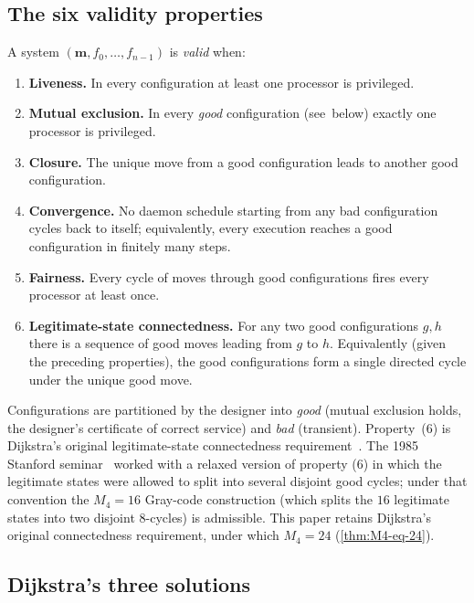 \documentclass[11pt,a4paper]{article}
\theoremstyle{plain}
\theoremstyle{definition}
\begin{document}
\subsection{The six validity properties}\label{sec:prelim-five}

A system $(\mathbf{m}, f_0, \ldots, f_{n-1})$ is \emph{valid} when:
\begin{enumerate}[leftmargin=*,label=(\arabic*)]
\item \textbf{Liveness.} In every configuration at least one processor is privileged.
\item \textbf{Mutual exclusion.} In every \emph{good} configuration
(see~below) exactly one processor is privileged.
\item \textbf{Closure.} The unique move from a good configuration leads
to another good configuration.
\item \textbf{Convergence.} No daemon schedule starting from any bad
configuration cycles back to itself; equivalently, every execution
reaches a good configuration in finitely many steps.
\item \textbf{Fairness.} Every cycle of moves through good configurations
fires every processor at least once.
\item \textbf{Legitimate-state connectedness.} For any two good
configurations $g, h$ there is a sequence of good moves leading from
$g$ to $h$.  Equivalently (given the preceding properties), the good
configurations form a single directed cycle under the unique good
move.
\end{enumerate}
Configurations are partitioned by the designer into \emph{good} (mutual
exclusion holds, the designer's certificate of correct service) and
\emph{bad} (transient).  Property~(6) is Dijkstra's original
legitimate-state connectedness
requirement~\cite[\S3]{Dijkstra1974}.  The 1985 Stanford
seminar~\cite[p.~70]{HaddadKnuth1985} worked with a relaxed version
of property (6) in which the legitimate states were allowed to
split into several disjoint good cycles; under that convention
the $M_4 = 16$ Gray-code construction (which splits the $16$
legitimate states into two disjoint $8$-cycles) is admissible.
This paper retains Dijkstra's original connectedness requirement,
under which $M_4 = 24$ (\cref{thm:M4-eq-24}).

\subsection{Dijkstra's three solutions}\label{sec:prelim-dijkstra}
\end{document}
